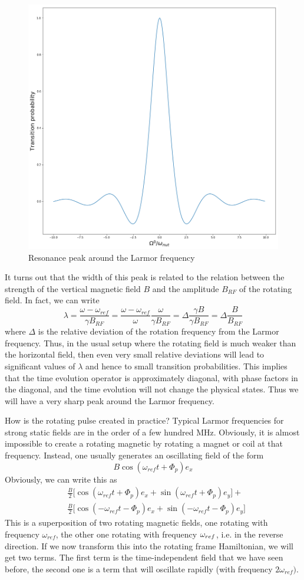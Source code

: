 \documentclass[a4paper, draft]{article}
\theoremstyle{own}
\theoremstyle{remark}
\begin{document}
\begin{figure}[ht]
\centering
\includegraphics[width=0.7\linewidth]{images/NMRResonance}
\caption[Resonance peak]{Resonance peak around the Larmor frequency}
\label{fig:NMRResonance}
\end{figure}

It turns out that the width of this peak is related to the relation between the strength of the vertical magnetic field $B$ and the amplitude $B_{RF}$ of the rotating field. In fact, we can write
$$
\lambda = \frac{\omega - \omega_{ref}}{\gamma B_{RF}} = \frac{\omega - \omega_{ref}}{\omega} \frac{\omega}{\gamma B_{RF}} = \Delta \frac{\gamma B}{\gamma B_{RF}}
= \Delta \frac{B}{B_{RF}}
$$
where $\Delta$ is the relative deviation of the rotation frequency from the Larmor frequency. Thus, in the usual setup where the rotating field is much weaker than the horizontal field, then even very small relative deviations will lead to significant values of $\lambda$ and hence to small transition probabilities. This implies that the time evolution operator is approximately diagonal, with phase factors in the diagonal, and the time evolution will not change the physical states. Thus we will have a very sharp peak around the Larmor frequency. 

How is the rotating pulse created in practice? Typical Larmor frequencies for strong static fields are in the order of a few hundred MHz. Obviously, it is almost impossible to create a rotating magnetic by rotating a magnet or coil at that frequency. Instead, one usually generates an oscillating field of the form
$$
B \cos (\omega_{ref} t + \Phi_p) e_x
$$
Obviously, we can write this as
\begin{align*}
& \frac{B}{2} \big[ \cos (\omega_{ref} t + \Phi_p) e_x + \sin (\omega_{ref} t + \Phi_p) e_y \big] + \\
& \frac{B}{2} \big[ \cos (-\omega_{ref} t - \Phi_p) e_x + \sin (-\omega_{ref} t - \Phi_p) e_y \big]
\end{align*}
This is a superposition of two rotating magnetic fields, one rotating with frequency $\omega_{ref}$, the other one rotating with frequency $\-\omega_{ref}$, i.e. in the reverse direction. If we now transform this into the rotating frame Hamiltonian, we will get two terms. The first term is the time-independent field that we have seen before, the second one is a term that will oscillate rapidly (with frequency $2\omega_{ref})$. 
\end{document}

